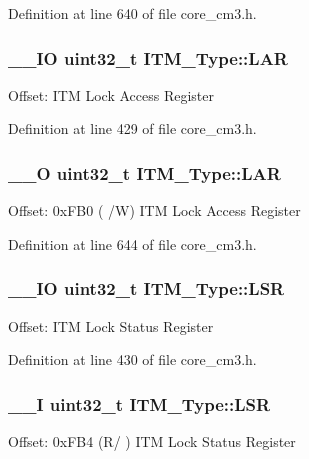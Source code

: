 Definition at line 640 of file core\-\_\-cm3.\-h.

\hypertarget{struct_i_t_m___type_a33025af19748bd3ca5cf9d6b14150001}{
\subsubsection[{L\-A\-R}]{\setlength{\rightskip}{0pt plus 5cm}\-\_\-\-\_\-\-I\-O {\bf uint32\-\_\-t} I\-T\-M\-\_\-\-Type\-::\-L\-A\-R}}\label{struct_i_t_m___type_a33025af19748bd3ca5cf9d6b14150001}
Offset\-: I\-T\-M Lock Access Register 

Definition at line 429 of file core\-\_\-cm3.\-h.

\hypertarget{struct_i_t_m___type_a97840d39a9c63331e3689b5fa69175e9}{
\subsubsection[{L\-A\-R}]{\setlength{\rightskip}{0pt plus 5cm}\-\_\-\-\_\-\-O {\bf uint32\-\_\-t} I\-T\-M\-\_\-\-Type\-::\-L\-A\-R}}\label{struct_i_t_m___type_a97840d39a9c63331e3689b5fa69175e9}
Offset\-: 0x\-F\-B0 ( /\-W) I\-T\-M Lock Access Register 

Definition at line 644 of file core\-\_\-cm3.\-h.

\hypertarget{struct_i_t_m___type_a56f607260c4175c5f37a28e47ab3d1e5}{
\subsubsection[{L\-S\-R}]{\setlength{\rightskip}{0pt plus 5cm}\-\_\-\-\_\-\-I\-O {\bf uint32\-\_\-t} I\-T\-M\-\_\-\-Type\-::\-L\-S\-R}}\label{struct_i_t_m___type_a56f607260c4175c5f37a28e47ab3d1e5}
Offset\-: I\-T\-M Lock Status Register 

Definition at line 430 of file core\-\_\-cm3.\-h.

\hypertarget{struct_i_t_m___type_aaa0515b1f6dd5e7d90b61ef67d8de77b}{
\subsubsection[{L\-S\-R}]{\setlength{\rightskip}{0pt plus 5cm}\-\_\-\-\_\-\-I {\bf uint32\-\_\-t} I\-T\-M\-\_\-\-Type\-::\-L\-S\-R}}\label{struct_i_t_m___type_aaa0515b1f6dd5e7d90b61ef67d8de77b}
Offset\-: 0x\-F\-B4 (R/ ) I\-T\-M Lock Status Register 

